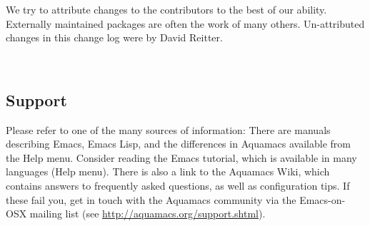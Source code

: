 \documentclass[11pt,letterpaper]{article}
\begin{document}
{\begin{figure*}[!b]
{\begin{minipage}{0.95\textwidth}
We try to attribute changes to the contributors to the best of our
ability. Externally maintained packages are often the work of many
others. Un-attributed changes in this change log were by David Reitter.

\vspace{8pt}
\end{minipage}
~~}
\end{figure*}
}



\subsection{Support}
Please refer to one of the many sources of information: There are
manuals describing Emacs, Emacs Lisp, and the differences in Aquamacs
available from the Help menu.  Consider reading the Emacs tutorial,
which is available in many languages (Help menu).  There is also a
link to the Aquamacs Wiki, which contains answers to frequently asked
questions, as well as configuration tips.  If these fail you, get in
touch with the Aquamacs community via the Emacs-on-OSX mailing list
(see \url{http://aquamacs.org/support.shtml}).
\end{document}
